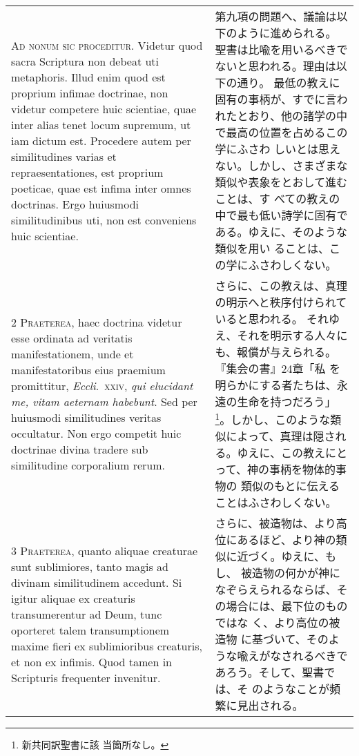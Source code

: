 \documentclass[10pt]{jsarticle} %
\begin{document}
\begin{longtable}{p{21em}p{21em}}


{\Huge A}{\scshape d nonum sic proceditur}. Videtur quod sacra
Scriptura non debeat uti metaphoris. Illud enim quod est proprium
infimae doctrinae, non videtur competere huic scientiae, quae inter
alias tenet locum supremum, ut iam dictum est. Procedere autem per
similitudines varias et repraesentationes, est proprium poeticae, quae
est infima inter omnes doctrinas. Ergo huiusmodi similitudinibus uti,
non est conveniens huic scientiae.


&

第九項の問題へ、議論は以下のように進められる。
聖書は比喩を用いるべきでないと思われる。理由は以下の通り。
最低の教えに固有の事柄が、すでに言われたとおり、他の諸学の中で最高の位置を占めるこの学にふさわ
 しいとは思えない。しかし、さまざまな類似や表象をとおして進むことは、す
 べての教えの中で最も低い詩学に固有である。ゆえに、そのような類似を用い
 ることは、この学にふさわしくない。



\\


{\scshape 2 Praeterea}, haec doctrina videtur esse
ordinata ad veritatis manifestationem, unde et manifestatoribus eius
praemium promittitur, {\itshape Eccli}.~{\scshape xxiv}, {\itshape qui elucidant me, vitam aeternam
habebunt}. Sed per huiusmodi similitudines veritas occultatur. Non ergo
competit huic doctrinae divina tradere sub similitudine corporalium
rerum.


&

さらに、この教えは、真理の明示へと秩序付けられていると思われる。
それゆえ、それを明示する人々にも、報償が与えられる。『集会の書』24章「私
 を明らかにする者たちは、永遠の生命を持つだろう」\footnote{新共同訳聖書に該
 当箇所なし。}。しかし、このような類
 似によって、真理は隠される。ゆえに、この教えにとって、神の事柄を物体的事物の
 類似のもとに伝えることはふさわしくない。


\\


{\scshape 3 Praeterea}, quanto aliquae creaturae sunt
sublimiores, tanto magis ad divinam similitudinem accedunt. Si igitur
aliquae ex creaturis transumerentur ad Deum, tunc oporteret talem
transumptionem maxime fieri ex sublimioribus creaturis, et non ex
infimis. Quod tamen in Scripturis frequenter invenitur.


&

さらに、被造物は、より高位にあるほど、より神の類似に近づく。ゆえに、もし、
 被造物の何かが神になぞらえられるならば、その場合には、最下位のものではな
 く、より高位の被造物
 に基づいて、そのような喩えがなされるべきであろう。そして、聖書では、そ
 のようなことが頻繁に見出される。



\end{longtable}
\end{document}
